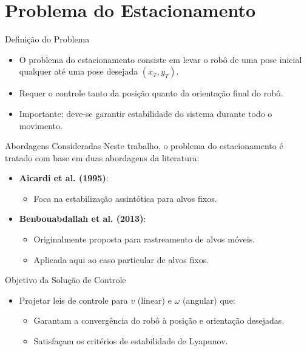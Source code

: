 \documentclass{beamer}
\begin{document}
\section{Problema do Estacionamento}

\begin{frame}{Definição do Problema}
  \begin{itemize}
    \item O problema do estacionamento consiste em levar o robô de uma pose inicial qualquer até uma pose desejada $(x_T, y_T)$.
    \item Requer o controle tanto da posição quanto da orientação final do robô.
    \item Importante: deve-se garantir estabilidade do sistema durante todo o movimento.
  \end{itemize}
\end{frame}

\begin{frame}{Abordagens Consideradas}
  Neste trabalho, o problema do estacionamento é tratado com base em duas abordagens da literatura:
  \begin{itemize}
    \item \textbf{Aicardi et al. (1995)}:
    \begin{itemize}
      \item Foca na estabilização assintótica para alvos fixos.
    \end{itemize}
    \item \textbf{Benbouabdallah et al. (2013)}:
    \begin{itemize}
      \item Originalmente proposta para rastreamento de alvos móveis.
      \item Aplicada aqui ao caso particular de alvos fixos.
    \end{itemize}
  \end{itemize}
\end{frame}

\begin{frame}{Objetivo da Solução de Controle}
  \begin{itemize}
    \item Projetar leis de controle para $v$ (linear) e $\omega$ (angular) que:
    \begin{itemize}
      \item Garantam a convergência do robô à posição e orientação desejadas.
      \item Satisfaçam os critérios de estabilidade de Lyapunov.
    \end{itemize}
  \end{itemize}
\end{frame}
\end{document}
